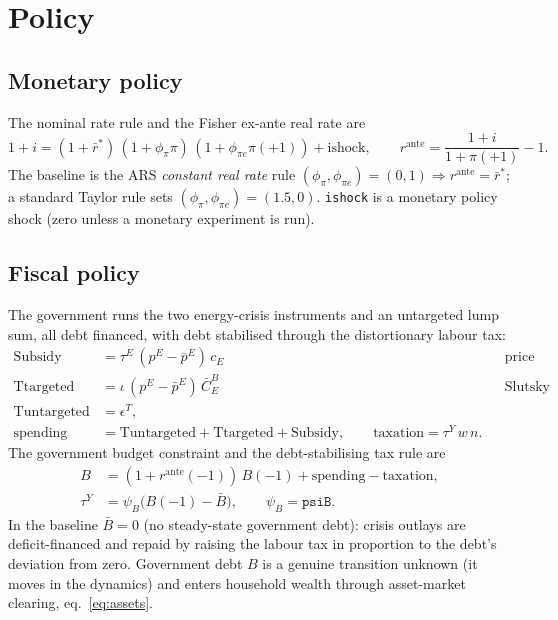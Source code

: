 \documentclass[11pt]{article}
\newcommand{\pE}{p^{E}}
\begin{document}
\section{Policy}\label{sec:policy}

\subsection{Monetary policy}

The nominal rate rule and the Fisher ex-ante real rate are
\begin{equation}
1+i = (1+\bar r^{*})\,(1+\phi_\pi\pi)\,(1+\phi_{\pi e}\pi(+1))+\text{ishock},
\qquad
r^{\text{ante}} = \frac{1+i}{1+\pi(+1)}-1.
\end{equation}
The baseline is the ARS \emph{constant real rate} rule
$(\phi_\pi,\phi_{\pi e})=(0,1)\Rightarrow r^{\text{ante}}=\bar r^{*}$; a standard
Taylor rule sets $(\phi_\pi,\phi_{\pi e})=(1.5,0)$. \texttt{ishock} is a monetary
policy shock (zero unless a monetary experiment is run).

\subsection{Fiscal policy}\label{sec:fiscal}

The government runs the two energy-crisis instruments and an untargeted lump sum,
all debt financed, with debt stabilised through the distortionary labour tax:
\begin{align}
\text{Subsidy} &= \tau^{E}\,(\pE-\bar\pE)\,c_E
&& \text{price cap (cost scales with actual use),}\\
\text{Ttargeted} &= \iota\,(\pE-\bar\pE)\,\bar C^{B}_{E}
&& \text{Slutsky transfer (cost scales with pre-crisis brown use),}\\
\text{Tuntargeted} &= \epsilon^{T}, &&\\[2pt]
\text{spending} &= \text{Tuntargeted}+\text{Ttargeted}+\text{Subsidy},\qquad
\text{taxation}=\tau^{Y}\,w\,n. &&
\end{align}
The government budget constraint and the debt-stabilising tax rule are
\begin{align}
B &= (1+r^{\text{ante}}(-1))\,B(-1)+\text{spending}-\text{taxation},
\label{eq:gbc}\\
\tau^{Y} &= \psi_B\bigl(B(-1)-\bar B\bigr),\qquad \psi_B=\texttt{psiB}.
\label{eq:taurule}
\end{align}
In the baseline $\bar B=0$ (no steady-state government debt): crisis outlays are
deficit-financed and repaid by raising the labour tax in proportion to the debt's
deviation from zero. Government debt $B$ is a genuine transition unknown (it moves
in the dynamics) and enters household wealth through asset-market clearing,
eq.~\eqref{eq:assets}.
\end{document}
